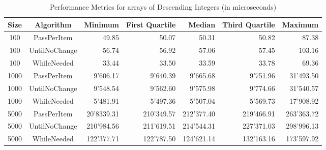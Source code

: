 \documentclass{article}
\begin{document}
\begin{table}[htbp]
    \centering
    \begin{tabular}{ccrrrrr}
        \toprule
        \textbf{Size} & \textbf{Algorithm} & \textbf{Minimum} & \textbf{First Quartile} & \textbf{Median} & \textbf{Third Quartile} & \textbf{Maximum} \\
        \midrule
        100 & PassPerItem & 49.85 & 50.07 & 50.31 & 50.82 & 87.38 \\
        100 & UntilNoChange & 56.74 & 56.92 & 57.06 & 57.45 & 103.16 \\
        100 & WhileNeeded & 33.44 & 33.50 & 33.59 & 33.78 & 69.36 \\
        1000 & PassPerItem & 9'606.17 & 9'640.39 & 9'665.68 & 9'751.96 & 31'493.50 \\
        1000 & UntilNoChange & 9'548.54 & 9'562.60 & 9'575.98 & 9'774.66 & 31'540.57 \\
        1000 & WhileNeeded & 5'481.91 & 5'497.36 & 5'507.04 & 5'569.73 & 17'908.92 \\
        5000 & PassPerItem & 20'8339.31 & 210'349.57 & 212'377.40 & 219'466.91 & 263'363.72 \\
        5000 & UntilNoChange & 210'984.56 & 211'619.51 & 214'544.31 & 227'371.03 & 298'996.13 \\
        5000 & WhileNeeded & 122'377.71 & 122'787.50 & 124'621.14 & 132'163.16 & 173'597.92 \\
        \bottomrule
    \end{tabular}
    \caption{Performance Metrics for arrays of Descending Integers (in microseconds)}
    \label{tab:performance}
\end{table}
\end{document}
